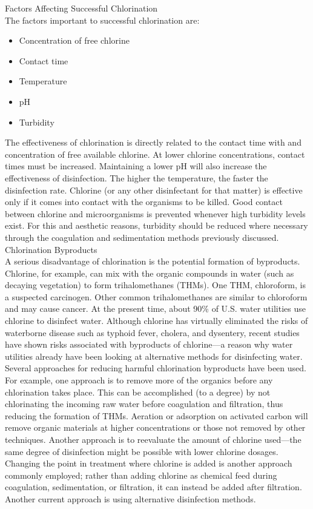 \documentclass{article}
\begin{document}
Factors Affecting Successful Chlorination\\
The factors important to successful chlorination are:
\begin{itemize}
\item Concentration of free chlorine
\item Contact time
\item Temperature
\item pH
\item Turbidity
\end{itemize}
The effectiveness of chlorination is directly related to the contact time with and concentration of free available chlorine. At lower chlorine concentrations, contact times must be increased. Maintaining a lower pH will also increase the effectiveness of disinfection. The higher the temperature, the faster the disinfection rate. Chlorine (or any other disinfectant for that matter) is effective only if it comes into contact with the organisms to be killed. Good contact between chlorine and microorganisms is prevented whenever high turbidity levels exist. For this and aesthetic reasons, turbidity should be reduced where necessary through the coagulation and sedimentation methods previously discussed.\\
Chlorination Byproducts\\
A serious disadvantage of chlorination is the potential formation of byproducts. Chlorine, for example, can mix with the organic compounds in water (such as decaying vegetation) to form trihalomethanes (THMs). One THM, chloroform, is a suspected carcinogen. Other common trihalomethanes are similar to chloroform and may cause cancer.
At the present time, about 90\% of U.S. water utilities use chlorine to disinfect water. Although chlorine has virtually eliminated the risks of waterborne disease such as typhoid fever, cholera, and dysentery, recent studies have shown risks associated with byproducts of chlorine—a reason why water utilities already have been looking at alternative methods for disinfecting water.
Several approaches for reducing harmful chlorination byproducts have been used. For example, one approach is to remove more of the organics before any chlorination takes place. This can be accomplished (to a degree) by not chlorinating the incoming
raw water before coagulation and filtration, thus reducing the formation of THMs. Aeration or adsorption on activated carbon will remove organic materials at higher concentrations or those not removed by other techniques. Another approach is to reevaluate the amount of chlorine used—the same degree of disinfection might be possible with lower chlorine dosages. Changing the point in treatment where chlorine is added is another approach commonly employed; rather than adding chlorine as chemical feed during coagulation, sedimentation, or filtration, it can instead be added after filtration. Another current approach is using alternative disinfection methods.\\
\end{document}
